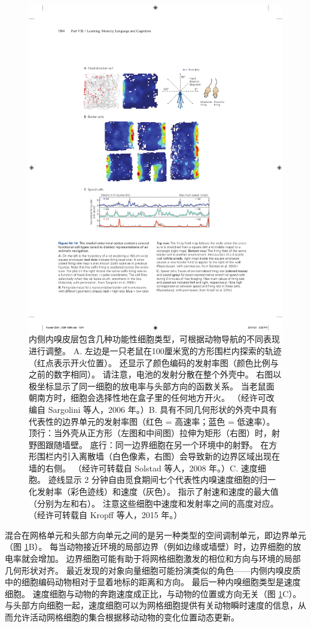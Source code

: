 \begin{figure}[htbp]
	\centering
	\includegraphics[width=0.7\linewidth]{chap54/fig_54_14}
	\caption{内侧内嗅皮层包含几种功能性细胞类型，可根据动物导航的不同表现进行调整。 A. 左边是一只老鼠在100厘米宽的方形围栏内探索的轨迹（红点表示开火位置）。 还显示了颜色编码的发射率图（颜色比例与之前的数字相同）。 请注意，电池的发射分散在整个外壳中。 右图以极坐标显示了同一细胞的放电率与头部方向的函数关系。 当老鼠面朝南方时，细胞会选择性地在盒子里的任何地方开火。 （经许可改编自 Sargolini 等人，2006 年。）B. 具有不同几何形状的外壳中具有代表性的边界单元的发射率图（红色 = 高速率；蓝色 = 低速率）。 顶行：当外壳从正方形（左图和中间图）拉伸为矩形（右图）时，射野图跟随墙壁。 底行：同一边界细胞在另一个环境中的射野。 在方形围栏内引入离散墙（白色像素，右图）会导致新的边界区域出现在墙的右侧。 （经许可转载自 Solstad 等人，2008 年。）C. 速度细胞。 迹线显示 2 分钟自由觅食期间七个代表性内嗅速度细胞的归一化发射率（彩色迹线）和速度（灰色）。 指示了射速和速度的最大值（分别为左和右）。 注意这些细胞中速度和发射率之间的高度对应。 （经许可转载自 Kropff 等人，2015 年。）}
	\label{fig:54_14}
\end{figure}

混合在网格单元和头部方向单元之间的是另一种类型的空间调制单元，即边界单元（图 \ref{fig:54_14}B）。 每当动物接近环境的局部边界（例如边缘或墙壁）时，边界细胞的放电率就会增加。 边界细胞可能有助于将网格细胞激发的相位和方向与环境的局部几何形状对齐。 最近发现的对象向量细胞可能扮演类似的角色——内侧内嗅皮质中的细胞编码动物相对于显着地标的距离和方向。 最后一种内嗅细胞类型是速度细胞。 速度细胞与动物的奔跑速度成正比，与动物的位置或方向无关（图 \ref{fig:54_14}C）。 与头部方向细胞一起，速度细胞可以为网格细胞提供有关动物瞬时速度的信息，从而允许活动网格细胞的集合根据移动动物的变化位置动态更新。

